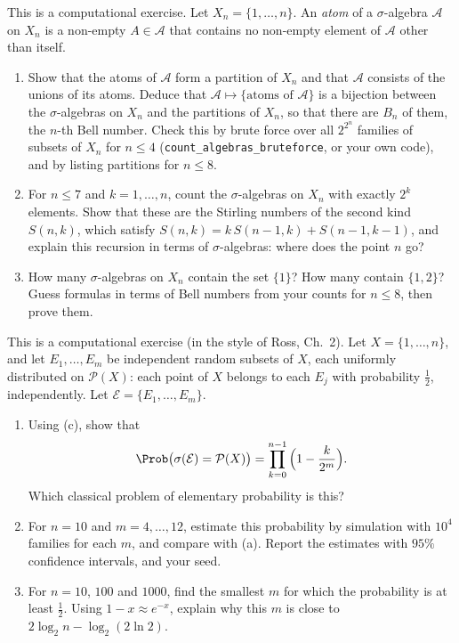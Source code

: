 \begin{exercise}\label{ex:sa-counting}
\medium This is a computational exercise. Let $X_n=\{1,\dots,n\}$. An \emph{atom} of a
$\sigma$-algebra $\mathcal A$ on $X_n$ is a non-empty $A\in\mathcal A$ that contains no non-empty
element of $\mathcal A$ other than itself.
\begin{enumerate}[label=(\alph*)]
  \item Show that the atoms of $\mathcal A$ form a partition of $X_n$ and that $\mathcal A$
    consists of the unions of its atoms. Deduce that $\mathcal A\mapsto\{\text{atoms of }\mathcal
    A\}$ is a bijection between the $\sigma$-algebras on $X_n$ and the partitions of $X_n$, so that
    there are $B_n$ of them, the $n$-th Bell number. Check this by brute force over all
    $2^{2^n}$ families of subsets of $X_n$ for $n\le4$ (\texttt{count\_algebras\_bruteforce}, or
    your own code), and by listing partitions for $n\le8$.
  \item For $n\le7$ and $k=1,\dots,n$, count the $\sigma$-algebras on $X_n$ with exactly $2^k$
    elements. Show that these are the Stirling numbers of the second kind $S(n,k)$, which satisfy
    $S(n,k)=k\,S(n-1,k)+S(n-1,k-1)$, and explain this recursion in terms of $\sigma$-algebras:
    where does the point $n$ go?
  \item How many $\sigma$-algebras on $X_n$ contain the set $\{1\}$? How many contain $\{1,2\}$?
    Guess formulas in terms of Bell numbers from your counts for $n\le8$, then prove them.
\end{enumerate}
\end{exercise}

\begin{exercise}\label{ex:sa-random-families}
\medium This is a computational exercise (in the style of Ross, Ch.~2). Let $X=\{1,\dots,n\}$,
and let $E_1,\dots,E_m$ be independent random subsets of $X$, each uniformly distributed on
$\mathcal P(X)$: each point of $X$ belongs to each $E_j$ with probability $\frac12$,
independently. Let $\mathcal E=\{E_1,\dots,E_m\}$.
\begin{enumerate}[label=(\alph*)]
  \item Using (c), show that
    \[
      \Prob\big(\sigma(\mathcal E)=\mathcal P(X)\big)=\prod_{k=0}^{n-1}\Big(1-\frac{k}{2^m}\Big).
    \]
    Which classical problem of elementary probability is this?
  \item For $n=10$ and $m=4,\dots,12$, estimate this probability by simulation with $10^4$
    families for each $m$, and compare with (a). Report the estimates with $95\%$ confidence
    intervals, and your seed.
  \item For $n=10$, $100$ and $1000$, find the smallest $m$ for which the probability is at least
    $\frac12$. Using $1-x\approx e^{-x}$, explain why this $m$ is close to
    $2\log_2n-\log_2(2\ln2)$.
\end{enumerate}
\end{exercise}

